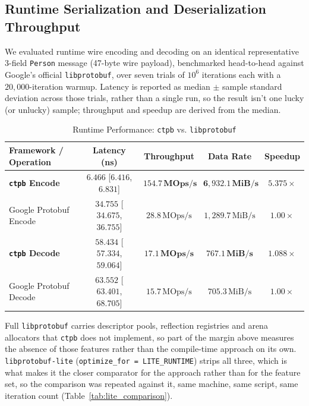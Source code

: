 \subsection{Runtime Serialization and Deserialization Throughput}
\label{sec:runtime_comparison}
We evaluated runtime wire encoding and decoding on an identical representative 3-field \texttt{Person} message (47-byte wire payload), benchmarked head-to-head against Google's official \texttt{libprotobuf}, over seven trials of $10^6$ iterations each with a $20{,}000$-iteration warmup. Latency is reported as median $\pm$ sample standard deviation across those trials, rather than a single run, so the result isn't one lucky (or unlucky) sample; throughput and speedup are derived from the median.

\begin{table}[ht]
\centering
\caption{Runtime Performance: \texttt{ctpb} vs. \texttt{libprotobuf}}
\label{tab:runtime_comparison}
\renewcommand{\arraystretch}{1.2}
\setlength{\tabcolsep}{2pt}
\tiny
\begin{tabular}{|l|c|c|c|c|}
\hline
\textbf{Framework / Operation} & \textbf{Latency (ns)} & \textbf{Throughput} & \textbf{Data Rate} & \textbf{Speedup} \\ \hline
\textbf{\texttt{ctpb} Encode} & $\mathbf{6.466}$ [$6.416$, $6.831$] & $\mathbf{154.7\,\text{MOps/s}}$ & $\mathbf{6{,}932.1\,\text{MiB/s}}$ & $\mathbf{5.375\times}$ \\ \hline
Google Protobuf Encode & $34.755$ [$34.675$, $36.755$] & $28.8\,\text{MOps/s}$ & $1{,}289.7\,\text{MiB/s}$ & $1.00\times$ \\ \hline\hline
\textbf{\texttt{ctpb} Decode} & $\mathbf{58.434}$ [$57.334$, $59.064$] & $\mathbf{17.1\,\text{MOps/s}}$ & $\mathbf{767.1\,\text{MiB/s}}$ & $\mathbf{1.088\times}$ \\ \hline
Google Protobuf Decode & $63.552$ [$63.401$, $68.705$] & $15.7\,\text{MOps/s}$ & $705.3\,\text{MiB/s}$ & $1.00\times$ \\ \hline
\end{tabular}
\end{table}

Full \texttt{libprotobuf} carries descriptor pools, reflection registries and arena allocators that \texttt{ctpb} does not implement, so part of the margin above measures the absence of those features rather than the compile-time approach on its own. \texttt{libprotobuf-lite} (\texttt{optimize\_for = LITE\_RUNTIME}) strips all three, which is what makes it the closer comparator for the approach rather than for the feature set, so the comparison was repeated against it, same machine, same script, same iteration count (Table~\ref{tab:lite_comparison}).

